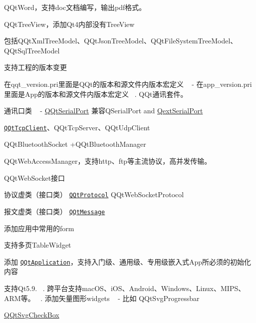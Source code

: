 \begin{DoxyEnumerate}
\item Q\+Qt\+Word，支持doc文档编写，输出pdf格式。
\item Q\+Qt\+Tree\+View，添加\+Qt4内部没有\+Tree\+View
\begin{DoxyItemize}
\item 包括\+Q\+Qt\+Xml\+Tree\+Model、\+Q\+Qt\+Json\+Tree\+Model、\+Q\+Qt\+File\+System\+Tree\+Model、\+Q\+Qt\+Sql\+Tree\+Model
\end{DoxyItemize}
\item 支持工程的版本变更
\begin{DoxyItemize}
\item 在qqt\+\_\+version.\+pri里面是\+Q\+Qt的版本和源文件内版本宏定义 ~\newline
 -\/ 在app\+\_\+version.\+pri里面是\+App的版本和源文件内版本宏定义 ~. Q\+Qt通讯套件。
\begin{DoxyItemize}
\item 通讯口类 ~\newline
 -\/ \mbox{\hyperlink{class_q_qt_serial_port}{Q\+Qt\+Serial\+Port}} 兼容\+Q\+Serial\+Port and \mbox{\hyperlink{class_qext_serial_port}{Qext\+Serial\+Port}}
\begin{DoxyItemize}
\item \href{src/network/qqttcpclient.h}{\tt Q\+Qt\+Tcp\+Client}、\+Q\+Qt\+Tcp\+Server、\+Q\+Qt\+Udp\+Client
\item Q\+Qt\+Bluetooth\+Socket +\+Q\+Qt\+Bluetooth\+Manager
\item Q\+Qt\+Web\+Access\+Manager，支持http、ftp等主流协议，高并发传输。
\item Q\+Qt\+Web\+Socket接口
\end{DoxyItemize}
\item 协议虚类（接口类） \href{src/network/qqtprotocol.h}{\tt Q\+Qt\+Protocol} Q\+Qt\+Web\+Socket\+Protocol
\item 报文虚类（接口类） \href{src/network/qqtmessage.h}{\tt Q\+Qt\+Message}
\end{DoxyItemize}
\end{DoxyItemize}
\item 添加应用中常用的form
\item 支持多页\+Table\+Widget
\item 添加 \href{src/frame/qqtapplication.h}{\tt Q\+Qt\+Application}，支持入门级、通用级、专用级嵌入式\+App所必须的初始化内容
\end{DoxyEnumerate}
\begin{DoxyEnumerate}
\item 支持\+Qt5.9. ~. 跨平台支持mac\+O\+S、i\+O\+S、\+Android、\+Windows、\+Linux、\+M\+I\+P\+S、\+A\+R\+M等。 ~. 添加矢量图形widgets ~\newline
 -\/ 比如 Q\+Qt\+Svg\+Progressbar
\begin{DoxyItemize}
\item \mbox{\hyperlink{class_q_qt_svg_check_box}{Q\+Qt\+Svg\+Check\+Box}}
\end{DoxyItemize}
\end{DoxyEnumerate}
